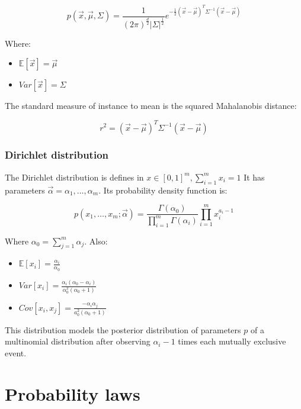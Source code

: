 		$$p(\vec{x}, \vec{\mu}, \Sigma) = \frac{1}{(2\pi)^{\frac{d}{2}}|\Sigma|^{\frac{1}{2}}}e^{-\frac{1}{2}(\vec{x}-\vec{\mu})^T\Sigma^{-1}(\vec{x}-\vec{\mu})}$$

		Where:

		\begin{multicols}{2}
			\begin{itemize}
				\item $\mathbb{E}[\vec{x}] = \vec{\mu}$
				\item $Var[\vec{x}] = \Sigma$
			\end{itemize}
		\end{multicols}

		The standard measure of instance to mean is the squared Mahalanobis distance:

		$$r^2 = (\vec{x}-\vec{\mu})^T\Sigma^{-1}(\vec{x}-\vec{\mu})$$

		\subsubsection{Dirichlet distribution}
		The Dirichlet distribution is defines in $x\in [0,1]^m, \sum\limits_{i=1}^m x_i = 1$
		It has parameters $\vec{\alpha} = \alpha_1, \dots, \alpha_m$.
		Its probability density function is:

		$$p(x_1, \dots, x_m; \vec{\alpha}) = \frac{\Gamma(\alpha_0)}{\prod\limits_{i=1}^m\Gamma(\alpha_i)}\prod\limits_{i=1}^mx_i^{a_i-1}$$

		Where $\alpha_0 = \sum\limits_{j=1}^m \alpha_j$.
		Also:

		\begin{multicols}{3}
			\begin{itemize}
				\item $\mathbb{E}[x_i] = \frac{\alpha_i}{\alpha_0}$
				\item $Var[x_i] = \frac{\alpha_i(\alpha_0-\alpha_i)}{\alpha_0^2(\alpha_0+1)}$
				\item $Cov[x_i, x_j] = \frac{-\alpha_i\alpha_j}{a_0^2(\alpha_0+1)}$
			\end{itemize}
		\end{multicols}

		This distribution models the posterior distribution of parameters $p$ of a multinomial distribution after observing $\alpha_i -1$ times each mutually exclusive event.

\section{Probability laws}

